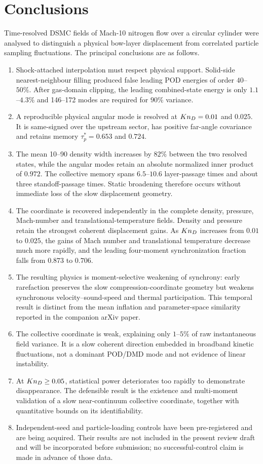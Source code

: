 \section{Conclusions}
Time-resolved DSMC fields of Mach-10 nitrogen flow over a circular cylinder were analysed to distinguish a physical bow-layer displacement from correlated particle sampling fluctuations. The principal conclusions are as follows.
\begin{enumerate}[leftmargin=1.6em]
\item Shock-attached interpolation must respect physical support. Solid-side nearest-neighbour filling produced false leading POD energies of order $40$--$50\%$. After gas-domain clipping, the leading combined-state energy is only $1.1$--$4.3\%$ and 146--172 modes are required for $90\%$ variance.
\item A reproducible physical angular mode is resolved at $Kn_D=0.01$ and $0.025$. It is same-signed over the upstream sector, has positive far-angle covariance and retains memory $\tau_p^*=0.653$ and $0.724$.
\item The mean 10--90 density width increases by $82\%$ between the two resolved states, while the angular modes retain an absolute normalized inner product of $0.972$. The collective memory spans $6.5$--$10.6$ layer-passage times and about three standoff-passage times. Static broadening therefore occurs without immediate loss of the slow displacement geometry.
\item The coordinate is recovered independently in the complete density, pressure, Mach-number and translational-temperature fields. Density and pressure retain the strongest coherent displacement gains. As $Kn_D$ increases from $0.01$ to $0.025$, the gains of Mach number and translational temperature decrease much more rapidly, and the leading four-moment synchronization fraction falls from $0.873$ to $0.706$.
\item The resulting physics is moment-selective weakening of synchrony: early rarefaction preserves the slow compression-coordinate geometry but weakens synchronous velocity--sound-speed and thermal participation. This temporal result is distinct from the mean inflation and parameter-space similarity reported in the companion arXiv paper.
\item The collective coordinate is weak, explaining only $1$--$5\%$ of raw instantaneous field variance. It is a slow coherent direction embedded in broadband kinetic fluctuations, not a dominant POD/DMD mode and not evidence of linear instability.
\item At $Kn_D\geq0.05$, statistical power deteriorates too rapidly to demonstrate disappearance. The defensible result is the existence and multi-moment validation of a slow near-continuum collective coordinate, together with quantitative bounds on its identifiability.
\item Independent-seed and particle-loading controls have been pre-registered and are being acquired. Their results are not included in the present review draft and will be incorporated before submission; no successful-control claim is made in advance of those data.
\end{enumerate}
